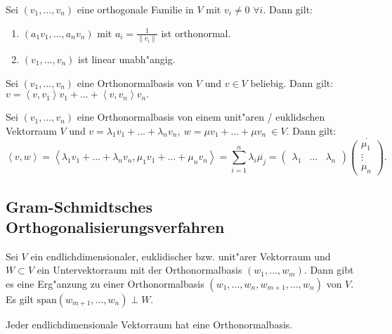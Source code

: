 \documentclass[9pt, a4paper, twocolumn, landscape]{article}
\begin{document}
\begin{remark}
Sei $(v_1, ..., v_n)$ eine orthogonale Familie in $V$ mit $v_i \neq 0$ $\forall i$. Dann gilt:
\begin{enumerate}
\item $(a_1 v_1, ..., a_n v_n)$ mit $a_i = \frac{1}{\|v_i\|}$ ist orthonormal.
\item $(v_1, ..., v_n)$ ist linear unabh"angig.
\end{enumerate}
\end{remark}

\begin{remark}
Sei $(v_1, ..., v_n)$ eine Orthonormalbasis von $V$ und $v \in V$ beliebig. Dann gilt:
$
v = \left\langle v, v_1 \right\rangle v_1 + ... + \left\langle v, v_n \right\rangle v_n.
$
\end{remark}

\begin{remark}
Sei $(v_1, ..., v_n)$ eine Orthonormalbasis von einem unit"aren / euklidschen Vektorraum $V$ und $v = \lambda_1 v_1 + ... + \lambda_n v_n, \ w =  \mu v_1 + ... + \mu v_n \  \in V$. Dann gilt:
$$
\left\langle v, w \right\rangle = \left\langle \lambda_1 v_1 + ... + \lambda_n v_n, \mu_1 v_1 + ... + \mu_n v_n \right\rangle = \sum\limits_{i = 1}^n \lambda_i \overline{\mu_j} = \left(\begin{array}{ccc}\lambda_1 & \hdots & \lambda_n \end{array} \right) \overline{\left(\begin{array}{c}\mu_1  \\ \vdots \\ \mu_n \end{array} \right)}.
$$
\end{remark}

\subsection{Gram-Schmidtsches Orthogonalisierungsverfahren}
\begin{theorem} 
Sei $V$ ein endlichdimensionaler, euklidischer bzw. unit"arer Vektorraum und $W \subset V$ ein Untervektorraum mit der Orthonormalbasis $(w_1, ..., w_m)$. Dann gibt es eine Erg"anzung zu einer Orthonormalbasis $(w_1, ..., w_n, w_{m+1}, ..., w_n)$ von $V$. Es gilt $\mathrm{span}(w_{m+1}, ..., w_n) \perp W$.
\end{theorem}

\begin{corollary}
Jeder endlichdimensionale Vektorraum hat eine Orthonormalbasis.
\end{corollary}
\end{document}
